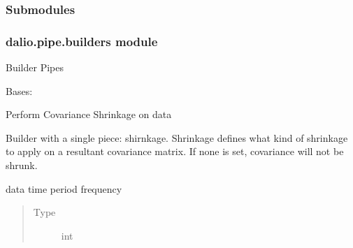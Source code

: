 \documentclass[letterpaper,10pt,english]{sphinxmanual}
\begin{document}
\subsubsection{Submodules}
\label{\detokenize{dalio.pipe:submodules}}

\subsubsection{dalio.pipe.builders module}
\label{\detokenize{dalio.pipe:module-dalio.pipe.builders}}\label{\detokenize{dalio.pipe:dalio-pipe-builders-module}}
Builder Pipes

\begin{fulllineitems}
\label{\detokenize{dalio.pipe:dalio.pipe.builders.CovShrink}}
Bases: {\hyperref[\detokenize{dalio.pipe:dalio.pipe.pipe.PipeBuilder}]{}}

Perform Covariance Shrinkage on data

Builder with a single piece: shirnkage. Shrinkage defines what kind of
shrinkage to apply on a resultant covariance matrix. If none is set,
covariance will not be shrunk.

\begin{fulllineitems}
\label{\detokenize{dalio.pipe:dalio.pipe.builders.CovShrink.frequency}}
data time period frequency
\begin{quote}\begin{description}
\item[{Type}] \leavevmode
int

\end{description}\end{quote}

\end{fulllineitems}



\end{fulllineitems}
\end{document}
